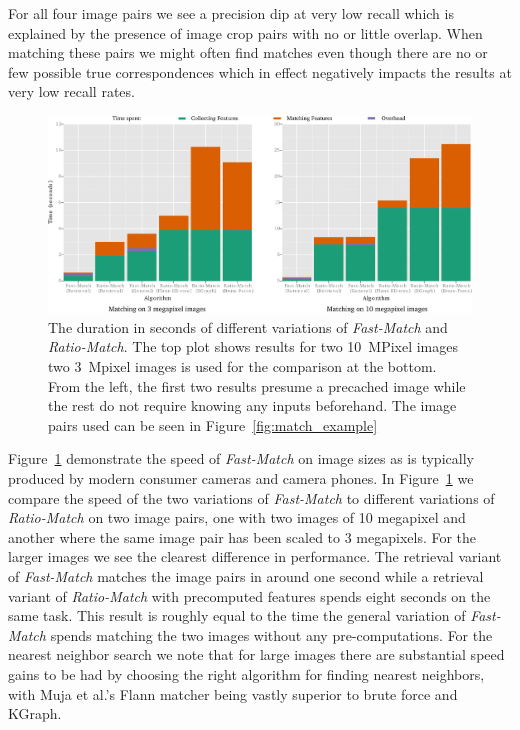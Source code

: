 \documentclass[10pt,twocolumn,letterpaper]{article}
\begin{document}
For all four image pairs we see a precision dip at very low recall which is explained by the presence of image crop pairs with no or little overlap. When matching these pairs we might often find matches even though there are no or few possible true correspondences which in effect negatively impacts the results at very low recall rates.

\begin{figure}[tb]
    \centering
    \includegraphics[width=1\columnwidth]{images/timings}
    \caption{The duration in seconds of different variations of
    \emph{Fast-Match} and \emph{Ratio-Match}. The top plot shows results
for two 10~MPixel images two 3~Mpixel images is used for the comparison
at the bottom. From the left, the first two results presume a precached
image while the rest do not require knowing any inputs beforehand. The
image pairs used can be seen in Figure~\ref{fig:match_example}}
    \label{fig:timings}
\end{figure}

Figure~\ref{fig:timings} demonstrate the speed of \emph{Fast-Match} on image sizes as is typically produced by modern consumer cameras and camera phones. In Figure~\ref{fig:timings} we compare the speed of the two variations of \emph{Fast-Match} to different variations of \emph{Ratio-Match} on two image pairs, one with two images of 10 megapixel and another where the same image pair has been scaled to 3 megapixels. For the larger images we see the clearest difference in performance. The retrieval variant of \emph{Fast-Match} matches the image pairs in around one second while a retrieval variant of \emph{Ratio-Match} with precomputed features spends eight seconds on the same task. This result is roughly equal to the time the general variation of \emph{Fast-Match} spends matching the two images without any pre-computations. For the nearest neighbor search we note that for large images there are substantial speed gains to be had by choosing the right algorithm for finding nearest neighbors, with Muja et al.'s Flann matcher being vastly superior to brute force and KGraph. 
\end{document}
